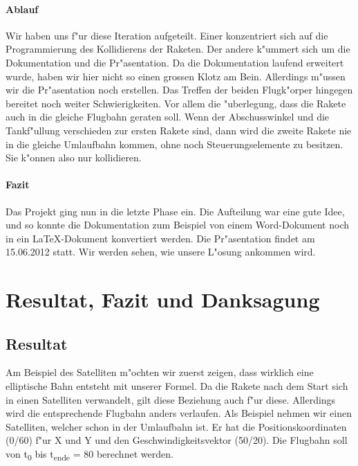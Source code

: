 \documentclass[11pt]{report}
\begin{document}
\subsubsection{Ablauf}
Wir haben uns f"ur diese Iteration aufgeteilt. Einer konzentriert sich auf die Programmierung des Kollidierens der Raketen. Der andere k"ummert sich um die Dokumentation und die Pr"asentation.
Da die Dokumentation laufend erweitert wurde, haben wir hier nicht so einen grossen Klotz am Bein. Allerdings m"ussen wir die Pr"asentation noch erstellen.
Das Treffen der beiden Flugk"orper hingegen bereitet noch weiter Schwierigkeiten. Vor allem die "uberlegung, dass die Rakete auch in die gleiche Flugbahn geraten soll. Wenn der Abschusswinkel und die Tankf"ullung verschieden zur ersten Rakete sind, dann wird die zweite Rakete nie in die gleiche Umlaufbahn kommen, ohne noch Steuerungselemente zu besitzen. Sie k"onnen also nur kollidieren.

\subsubsection{Fazit}
Das Projekt ging nun in die letzte Phase ein. Die Aufteilung war eine gute Idee, und so konnte die Dokumentation zum Beispiel von einem Word-Dokument noch in ein LaTeX-Dokument konvertiert werden. Die Pr"asentation findet am 15.06.2012 statt. Wir werden sehen, wie unsere L"osung ankommen wird.
\newpage
\chapter{Resultat, Fazit und Danksagung}
\section{Resultat}
Am Beispiel des Satelliten m"ochten wir zuerst zeigen, dass wirklich eine elliptische Bahn entsteht mit unserer Formel. Da die Rakete nach dem Start sich in einen Satelliten verwandelt, gilt diese Beziehung auch f"ur diese. Allerdings wird die entsprechende Flugbahn anders verlaufen. Als Beispiel nehmen wir einen Satelliten, welcher schon in der Umlaufbahn ist. Er hat die Positionskoordinaten (0/60) f"ur X und Y und den Geschwindigkeitsvektor (50/20). Die Flugbahn soll von t\textsubscript{0} bis t\textsubscript{ende} = 80 berechnet werden.
\linebreak
\end{document}

